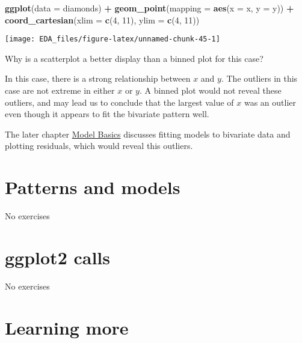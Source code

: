 \documentclass[]{book}
\newenvironment{Shaded}{\begin{snugshade}}{\end{snugshade}}
\newcommand{\DataTypeTok}[1]{\textcolor[rgb]{0.13,0.29,0.53}{#1}}
\newcommand{\DecValTok}[1]{\textcolor[rgb]{0.00,0.00,0.81}{#1}}
\newcommand{\KeywordTok}[1]{\textcolor[rgb]{0.13,0.29,0.53}{\textbf{#1}}}
\newcommand{\NormalTok}[1]{#1}
\newcommand{\OperatorTok}[1]{\textcolor[rgb]{0.81,0.36,0.00}{\textbf{#1}}}
\newcommand{\StringTok}[1]{\textcolor[rgb]{0.31,0.60,0.02}{#1}}
\theoremstyle{plain}
\theoremstyle{remark}
\begin{document}
\begin{Shaded}
\begin{Highlighting}[]
\KeywordTok{ggplot}\NormalTok{(}\DataTypeTok{data =}\NormalTok{ diamonds) }\OperatorTok{+}
\StringTok{  }\KeywordTok{geom_point}\NormalTok{(}\DataTypeTok{mapping =} \KeywordTok{aes}\NormalTok{(}\DataTypeTok{x =}\NormalTok{ x, }\DataTypeTok{y =}\NormalTok{ y)) }\OperatorTok{+}
\StringTok{  }\KeywordTok{coord_cartesian}\NormalTok{(}\DataTypeTok{xlim =} \KeywordTok{c}\NormalTok{(}\DecValTok{4}\NormalTok{, }\DecValTok{11}\NormalTok{), }\DataTypeTok{ylim =} \KeywordTok{c}\NormalTok{(}\DecValTok{4}\NormalTok{, }\DecValTok{11}\NormalTok{))}
\end{Highlighting}
\end{Shaded}

\begin{center}\texttt{[image: EDA\_files/figure-latex/unnamed-chunk-45-1]} \end{center}

Why is a scatterplot a better display than a binned plot for this case?

In this case, there is a strong relationship between \(x\) and \(y\).
The outliers in this case are not extreme in either \(x\) or \(y\). A
binned plot would not reveal these outliers, and may lead us to conclude
that the largest value of \(x\) was an outlier even though it appears to
fit the bivariate pattern well.

The later chapter \protect\hyperlink{model-basics}{Model Basics}
discusses fitting models to bivariate data and plotting residuals, which
would reveal this outliers.

\hypertarget{patterns-and-models}{%
\section{Patterns and models}\label{patterns-and-models}}

No exercises

\hypertarget{ggplot2-calls}{%
\section{ggplot2 calls}\label{ggplot2-calls}}

No exercises

\hypertarget{learning-more}{%
\section{Learning more}\label{learning-more}}
\end{document}
